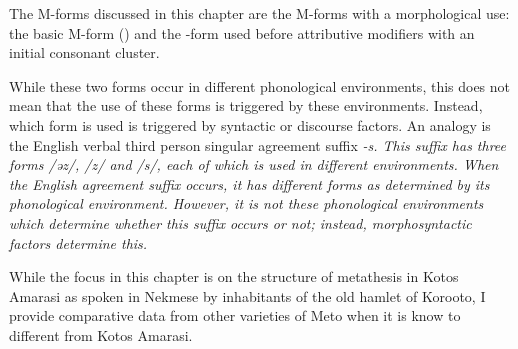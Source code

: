 The M-forms discussed in this chapter
are the M-forms with a morphological use:
the basic M-form ({\M}) and the {\MC}-form
used before attributive modifiers with an initial consonant cluster.

While these two forms occur in
different phonological environments,
this does not mean that the use of these forms
is triggered by these environments.
Instead, which form is used is triggered
by syntactic or discourse factors.
An analogy is the English verbal third person singular agreement suffix \it{-s}.
This suffix has three forms /əz/, /z/ and /s/,
each of which is used in different environments.
When the English  agreement suffix occurs,
it has different forms as determined by its phonological environment.
However, it is not these phonological environments
which determine whether this suffix occurs or not;
instead, morphosyntactic factors determine this.

While the focus in this chapter is on the structure
of metathesis in Kotos Amarasi as spoken in Nekmese{\Q} by
inhabitants of the old hamlet of Koro{\Q}oto, I provide
comparative data from other varieties of Meto when it is
know to different from Kotos Amarasi.


	
	
	



